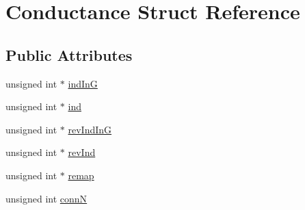 \hypertarget{structConductance}{\section{Conductance Struct Reference}
\label{structConductance}
}
\subsection*{Public Attributes}
\begin{DoxyCompactItemize}
\item 
unsigned int $\ast$ \hyperlink{structConductance_aac96f8639db845dc733f83944dafce00}{ind\+In\+G}
\item 
unsigned int $\ast$ \hyperlink{structConductance_afa2f0420b680f4d60704450a5ba355e0}{ind}
\item 
unsigned int $\ast$ \hyperlink{structConductance_a681be6b793502e01ac9c7c6fbfa69a44}{rev\+Ind\+In\+G}
\item 
unsigned int $\ast$ \hyperlink{structConductance_a9ebca206ebf232c47217135a42efe74b}{rev\+Ind}
\item 
unsigned int $\ast$ \hyperlink{structConductance_a502fa78df80f5d22933602b799e96a50}{remap}
\item 
unsigned int \hyperlink{structConductance_aee4c4f7e96d92c85847b5768c87cf4fa}{conn\+N}
\end{DoxyCompactItemize}


